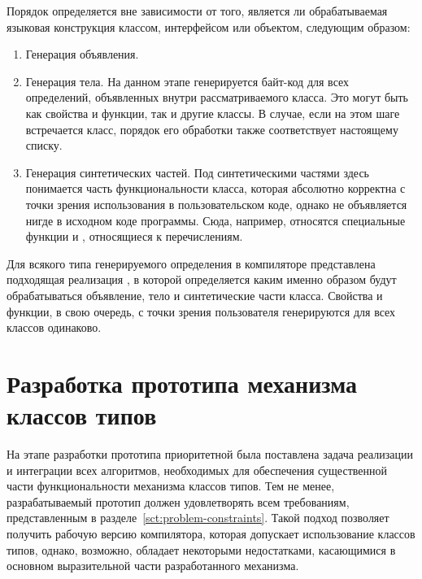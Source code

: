 Порядок определяется вне зависимости от того, является ли обрабатываемая языковая конструкция классом, интерфейсом или объектом, следующим образом:
\begin{enumerate}
    \item Генерация объявления.
    \item Генерация тела. На данном этапе генерируется байт-код для всех определений, объявленных внутри рассматриваемого класса. Это могут быть как свойства и функции, так и другие классы. В случае, если на этом шаге встречается класс, порядок его обработки также соответствует настоящему списку. 
    \item Генерация синтетических частей. Под синтетическими частями здесь понимается часть функциональности класса, которая абсолютно корректна с точки зрения использования в пользовательском коде, однако не объявляется нигде в исходном коде программы. Сюда, например, относятся специальные функции  и , относящиеся к перечислениям.
\end{enumerate}
Для всякого типа генерируемого определения в компиляторе представлена подходящая реализация , в которой определяется каким именно образом будут обрабатываться объявление, тело и синтетические части класса. Свойства и функции, в свою очередь, с точки зрения пользователя  генерируются для всех классов одинаково.

\section{Разработка прототипа механизма классов типов}

На этапе разработки прототипа приоритетной была поставлена задача реализации и интеграции всех алгоритмов, необходимых для обеспечения существенной части функциональности механизма классов типов. Тем не менее, разрабатываемый прототип должен удовлетворять всем требованиям, представленным в разделе~\ref{sct:problem-constraints}. Такой подход позволяет получить рабочую версию компилятора, которая допускает использование классов типов, однако, возможно, обладает некоторыми недостатками, касающимися в основном выразительной части разработанного механизма. 

